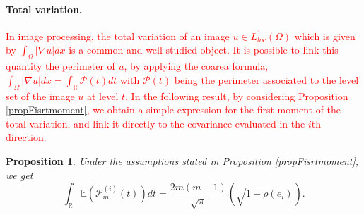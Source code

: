 \documentclass[12pt]{article}
\theoremstyle{Theorem}
\newtheorem{Proposition}[Theorem]{Proposition}
\theoremstyle{definition}
\begin{document}
\paragraph{Total variation.}
\textcolor{red}{
In image processing, the total variation of an image $u \in L^{1}_{loc}(\Omega)$ which is given by $\int_{\Omega}|\nabla u|dx$ is a common and well studied object. It is possible to link this quantity the perimeter of $u$, by applying the coarea formula, $\int_{\Omega}|\nabla u|dx = \int_{\mathbb{R}}\mathcal{P}(t)dt$ with $\mathcal{P}(t)$ being the perimeter associated to the level set of the image $u$ at level $t$. In the following result, by considering Proposition \eqref{propFisrtmoment}, we obtain a simple expression for the first moment of the total variation, and link it directly to the covariance evaluated in the $i$th direction.}
\begin{Proposition}
\label{Variationtotal}
Under the assumptions stated in Proposition \ref{propFisrtmoment}, we get 
\begin{equation}
\label{totalvariation}
\int_{\mathbb{R}} \mathbb{E}\left(\mathcal{P}^{(i)}_{m}(t)\right) dt = \frac{2m(m-1)}{\sqrt{\pi}}\left(\sqrt{1-\rho(e_i)}  \right).
\end{equation}
\end{Proposition}
\end{document}
